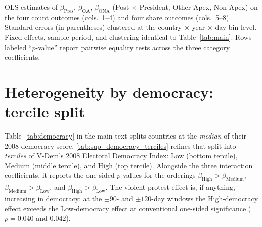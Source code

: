 \documentclass[11pt]{article}
\let\mathbetasym\beta
\renewcommand{\beta}{\ensuremath{\mathbetasym}}
\begin{document}
\begin{table}[htb!]
    \caption{Pooled interaction regression: hierarchy of the protest response.}
    \label{tab:sup_hierarchy}
    \begin{center}
        \scriptsize{}
    \end{center}
    \footnotesize{OLS estimates of $\beta_{\text{Pres}}$, $\beta_{\text{OA}}$, $\beta_{\text{ONA}}$ (Post $\times$ President, Other Apex, Non-Apex) on the four count outcomes (cols.\ 1--4) and four share outcomes (cols.\ 5--8). Standard errors (in parentheses) clustered at the country $\times$ year $\times$ day-bin level. Fixed effects, sample period, and clustering identical to Table~\ref{tab:main}. Rows labeled ``$p$-value'' report pairwise equality tests across the three category coefficients.}
\end{table}

\clearpage
\section{Heterogeneity by democracy: tercile split}\label{sup:democracy_terciles}

Table~\ref{tab:democracy} in the main text splits countries at the \emph{median} of their 2008 democracy score. \autoref{tab:sup_democracy_terciles} refines that split into \emph{terciles} of V-Dem's 2008 Electoral Democracy Index: Low (bottom tercile), Medium (middle tercile), and High (top tercile). Alongside the three interaction coefficients, it reports the one-sided $p$-values for the orderings $\beta_{\text{High}}>\beta_{\text{Medium}}$, $\beta_{\text{Medium}}>\beta_{\text{Low}}$, and $\beta_{\text{High}}>\beta_{\text{Low}}$. The violent-protest effect is, if anything, increasing in democracy: at the $\pm 90$- and $\pm 120$-day windows the High-democracy effect exceeds the Low-democracy effect at conventional one-sided significance ($p=0.040$ and $0.042$).
\end{document}
